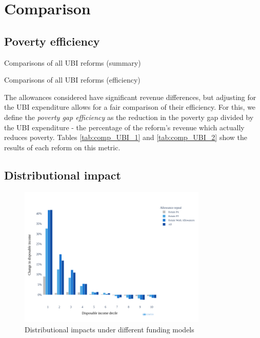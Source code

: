 \documentclass{article}
\begin{document}
    \section{Comparison}

    \subsection{Poverty efficiency}

    \begin{table}[h]
        \centering
        
        \caption{Comparisons of all UBI reforms (summary)}
        \label{tab:comp_UBI_1}
    \end{table}

    \begin{table}[h]
        \centering
        
        \caption{Comparisons of all UBI reforms (efficiency)}
        \label{tab:comp_UBI_2}
    \end{table}

    The allowances considered have significant revenue differences, but adjusting for the UBI expenditure allows for a fair comparison of their efficiency. For this, we define the \emph{poverty gap efficiency} as the reduction in the poverty gap divided by the UBI expenditure - the percentage of the reform's revenue which actually reduces poverty. Tables \ref{tab:comp_UBI_1} and \ref{tab:comp_UBI_2} show the results of each reform on this metric.
    \subsection{Distributional impact}

    \begin{figure}
        \centering
        \includegraphics[width=0.8\textwidth]{images/fig_13.png}
        \caption{Distributional impacts under different funding models}
        \label{fig:distr_comp}
    \end{figure}
\end{document}
